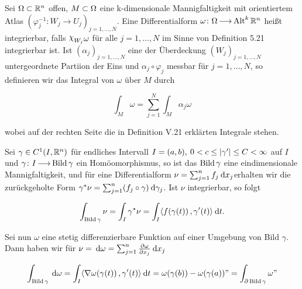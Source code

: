 \documentclass[skript.tex]{subfiles}
\begin{document}
		\begin{defin}
			Sei $ \Omega \subset {\mathbb{R}^n}$ offen, $M \subset \Omega$ eine k-dimensionale Mannigfaltigkeit mit orientiertem Atlas $(\varphi_j^{-1} \colon W_j \to U_j)_{j = 1, \dots, N}$. Eine Differentialform $\omega \colon \Omega \kern -1pt \longrightarrow \kern -1pt \operatorname{Alt}^k {\mathbb{R}^n}$ heißt integrierbar, falls $\rchi_{W_j} \omega$ für alle 
			$j = 1, \dots , N$ im Sinne von Definition 5.21 integrierbar ist. Ist $(\alpha_j)_{j=1, \dots, N}$ eine der Überdeckung $(W_j)_{j = 1, \dots, N}$ untergeordnete Partiion der Eins und $\alpha_j \circ \varphi_j$ messbar für $j = 1, \dots , N$, so definieren wir das Integral von $\omega$ über $M$ durch 
			
			\begin{equation*}
			\int_M \omega = \sum_{j=1}^{N} \int_M \alpha_j \omega
			\end{equation*}
			
			wobei auf der rechten Seite die in Definition V.21 erklärten Integrale stehen.
		\end{defin}
	
		\begin{bsp}[Kurvenintegrale]
			Sei $\gamma \in C^1(I, {\mathbb{R}^n})$ für endliches Intervall $I = (a,b), \: 0<c \leq \left| \gamma ' \right| \leq C < \infty$ auf $I$ und $ \gamma \colon I \kern -1pt \longrightarrow \kern -1pt \operatorname{Bild}\gamma$ ein Homöomorphismus, so ist das $\operatorname{Bild}\gamma$ eine eindimensionale Mannigfaltigkeit, und für eine Differentialform $\nu = \sum_{j=1}^{n} f_j \: \mathrm{d} x_j$erhalten wir die zurückgeholte Form $\gamma^* \nu = \sum_{j=1}^{n} (f_j \circ \gamma) \: \mathrm{d} \gamma_j$. Ist $\nu$ integrierbar, so folgt
			
			\begin{equation*}
			\int_{\operatorname{Bild} \gamma} \nu = \int_I \gamma^* \nu = \int_I \langle f(\gamma(t))\,{,}\,\gamma'(t) \rangle \: \mathrm{d} t.
			\end{equation*}
			
			Sei nun $\omega$ eine stetig differenzierbare Funktion auf einer Umgebung von Bild $\gamma$. Dann haben wir für $\nu = \: \mathrm{d} \omega= \sum_{j=1}^{n} \frac{\partial \omega}{\partial x_j} \: \mathrm{d} x_j$
			
			\begin{equation*}
			\int_{\operatorname{Bild}\gamma} \: \mathrm{d} \omega = \int_I \langle \nabla \omega( \gamma(t))\,{,}\,\gamma' (t) \rangle \: \mathrm{d} t = \omega(\gamma(b)) - \omega(\gamma(a)) "= \int_{\partial \operatorname{Bild} \gamma} \omega"
			\end{equation*}
			
			\end{bsp}
			
\end{document}

